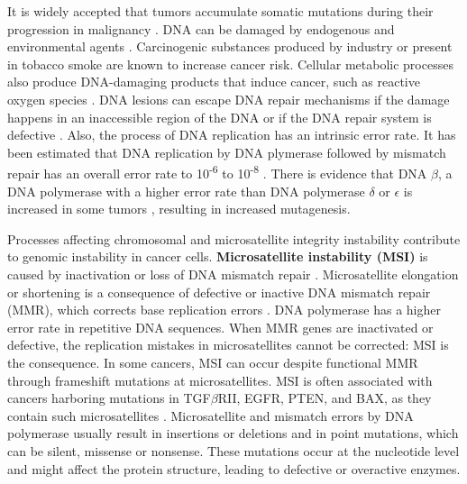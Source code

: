     It is widely accepted that tumors accumulate somatic mutations during their
    progression in malignancy {\cite{accumulation_rates}}
    {\cite{mutations_counting}}. DNA can be damaged by endogenous and
    environmental agents {\cite{multiple_mutations}}. Carcinogenic substances
    produced by industry {\cite{occupational_exposure}} {\cite{rubber_industry}}
    or present in tobacco smoke {\cite{smoking_cancer}} are known to increase
    cancer risk. Cellular metabolic processes also produce DNA-damaging products
    that induce cancer, such as reactive oxygen species {\cite{ros_cancer}}
    {\cite{ros_cancer_other}}. DNA lesions can escape DNA repair mechanisms if
    the damage happens in an inaccessible region of the DNA or if the DNA repair
    system is defective {\cite{dna_repair}}. Also, the process of DNA
    replication has an intrinsic error rate. It has been estimated that DNA
    replication by DNA plymerase followed by mismatch repair has an overall
    error rate to 10\textsuperscript{-6} to 10\textsuperscript{-8}
    {\cite{multiple_mutations}}. There is evidence that DNA $\beta$, a DNA
    polymerase with a higher error rate than DNA polymerase $\delta$ or
    $\epsilon$ is increased in some tumors {\cite{dna_pol}}, resulting in
    increased mutagenesis.

    Processes affecting chromosomal and microsatellite integrity instability
    contribute to genomic instability in cancer cells. \textbf{Microsatellite
    instability (MSI)} is caused by inactivation or loss of DNA mismatch repair
    {\cite{msi}}. Microsatellite elongation or shortening is a consequence of
    defective or inactive DNA mismatch repair (MMR), which corrects base
    replication errors {\cite{cin_crc}}. DNA polymerase has a higher error rate
    in repetitive DNA sequences. When MMR genes are inactivated or defective,
    the replication mistakes in microsatellites cannot be corrected: MSI is the
    consequence. In some cancers, MSI can occur despite functional MMR through
    frameshift mutations at microsatellites. MSI is often associated with
    cancers harboring mutations in TGF$\beta$RII, EGFR, PTEN, and BAX, as they
    contain such microsatellites {\cite{micro}}. Microsatellite and mismatch
    errors by DNA polymerase usually result in insertions or deletions and in
    point mutations, which can be silent, missense or nonsense. These mutations
    occur at the nucleotide level and  might affect the protein structure,
    leading to defective or overactive  enzymes.

